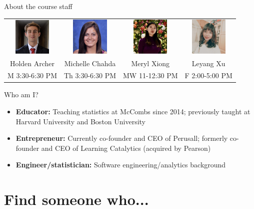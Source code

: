 \documentclass{beamer}\usepackage[]{graphicx}\usepackage[]{color}
\begin{document}
\begin{darkframes}
\begin{frame}{About the course staff}
      \vspace{0.2in}
      \hspace*{-0.3in}\begin{tabular}{cccc}
        \includegraphics[width=0.7in]{holden} &
        \includegraphics[width=0.7in]{michelle} &
        \includegraphics[width=0.7in]{meryl} &
        \includegraphics[width=0.7in]{leyang} \\
        Holden Archer & Michelle Chahda  & Meryl Xiong & Leyang Xu \\
        M 3:30-6:30 PM & Th 3:30-6:30 PM & MW 11-12:30 PM & F 2:00-5:00 PM  \\
      \end{tabular}
    \end{frame}

    \begin{frame}{Who am I?}
      \begin{itemize}
        \item \textbf{Educator:} Teaching statistics at McCombs since 2014; previously taught at Harvard University and Boston University
        \item \textbf{Entrepreneur:} Currently co-founder and CEO of Perusall; formerly co-founder and CEO of Learning Catalytics (acquired by Pearson)
        \item \textbf{Engineer/statistician:} Software engineering/analytics background
      \end{itemize}
    \end{frame}

    \section{Find someone who...}


\end{darkframes}
\end{document}
